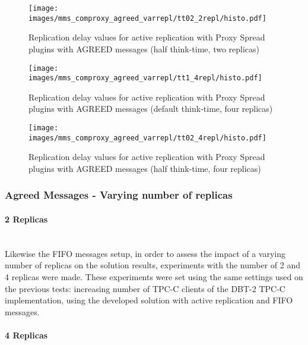 \begin{figure}[h!]
\centering    
\texttt{[image: images/mms\_comproxy\_agreed\_varrepl/tt02\_2repl/histo.pdf]}
\caption{Replication delay values for active replication with Proxy Spread plugins with AGREED messages (half think-time, two replicas)}
\label{fig:mms_comproxy_agreed_2repl_tt02}
\end{figure}

\clearpage

\begin{figure}[h!]
\centering    
\texttt{[image: images/mms\_comproxy\_agreed\_varrepl/tt1\_4repl/histo.pdf]}
\caption{Replication delay values for active replication with Proxy Spread plugins with AGREED messages (default think-time, four replicas)}
\label{fig:mms_comproxy_agreed_4repl_tt1}
\end{figure}


\begin{figure}[h!]
\centering    
\texttt{[image: images/mms\_comproxy\_agreed\_varrepl/tt02\_4repl/histo.pdf]}
\caption{Replication delay values for active replication with Proxy Spread plugins with AGREED messages (half think-time, four replicas)}
\label{fig:mms_comproxy_agreed_4repl_tt02}
\end{figure}

\clearpage

\subsubsection{Agreed Messages - Varying number of replicas}

\paragraph{2 Replicas\\ \\}

Likewise the FIFO messages setup, in order to assess the impact of a varying number of replicas on the solution results, experiments with the number of 2 and 4 replicas were made. These experiments were set using the same settings used on the previous tests: increasing number of TPC-C clients of the DBT-2 TPC-C implementation, using the developed solution with active replication and FIFO messages.





\paragraph{4 Replicas\\ \\}




